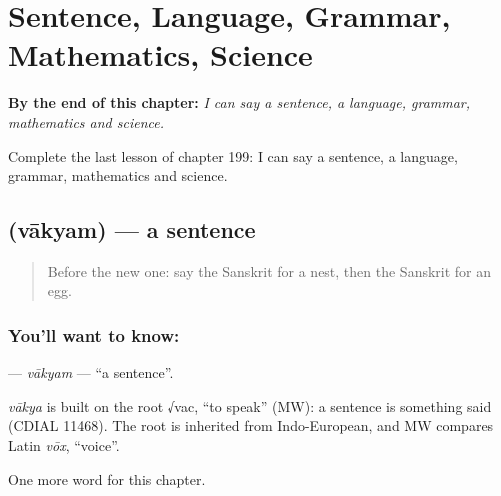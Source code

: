
\chapter{Sentence, Language, Grammar, Mathematics, Science}
\label{ch:sa-sentence-language-grammar-mathematics-science}

\begin{chapteropening}
\textbf{By the end of this chapter:} \emph{I can say a sentence, a language, grammar, mathematics and science.}

Complete the last lesson of chapter 199: I can say a sentence, a language, grammar, mathematics and science.
\end{chapteropening}

\section[\texorpdfstring{\sk{वाक्यम्} (vākyam)}{वाक्यम् (vākyam)}]{ (vākyam) — a sentence}

\label{lesson:SA-C199-vakyam}



\begin{quote}
Before the new one: say the Sanskrit for a nest, then the Sanskrit for an egg.
\end{quote}

\subsection*{You'll want to know: }
\textbf{} — \emph{vākyam} — \textquotedblleft{}a sentence\textquotedblright{}.

\begin{cousinweb}
\emph{vākya} is built on the root √vac, \textquotedblleft{}to speak\textquotedblright{} (MW): a sentence is something said (CDIAL 11468). The root is inherited from Indo-European, and MW compares Latin \emph{vōx}, \textquotedblleft{}voice\textquotedblright{}.
\end{cousinweb}

\begin{grammarlens}[title={What you've built}]
One more word for this chapter.
\end{grammarlens}

